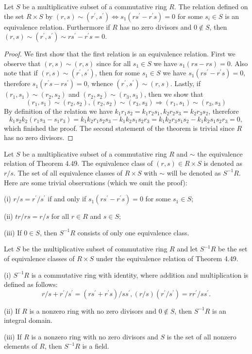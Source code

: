 \begin{theorem}
Let $S$ be a multiplicative subset of a commutative ring $R$. The relation defined on the set $R\times S$ by $(r,s)\sim(r^\prime,s^\prime)\Leftrightarrow s_1(rs^\prime-r^\prime s)=0$ for some $s_i\in S$ is an equivalence relation. Furthermore if $R$ has no zero divisors and $0\notin S$, then $(r,s)\sim(r^\prime,s^\prime)\sim rs^\prime-r^\prime s=0$.
\end{theorem}
\begin{proof}
We first show that the first relation is an equivalence relation. First we observe that $(r,s)\sim(r,s)$ since for all $s_1\in S$ we have $s_1(rs-rs)=0$. Also note that if $(r,s)\sim(r^\prime,s^\prime)$, then for some $s_1\in S$ we have $s_1(rs^\prime-r^\prime s)=0$, therefore $s_1(r^\prime s-rs^\prime)=0$, whence $(r^\prime,s^\prime)\sim(r,s)$. Lastly, if $(r_1,s_1)\sim(r_2,s_2)$ and $(r_2,s_2)\sim(r_3,s_3)$, then we show that 
$$
\left( r_1,s_1 \right) \sim \left( r_2,s_2 \right) ,\left( r_2,s_2 \right) \sim \left( r_3,s_3 \right) \Rightarrow \left( r_1,s_1 \right) \sim \left( r_3,s_3 \right) 
$$
By definition of the relation we have $k_1r_1s_2=k_1r_2s_1,k_2r_2s_3=k_2r_3s_2$, therefore 
$$
k_1s_2k_2\left( r_1s_3-s_1r_3 \right) =k_1k_2r_1s_2s_3-k_1k_2s_1s_2r_3=k_1k_2r_3s_1s_2-k_1k_2s_1s_2r_3=0,
$$
which finished the proof. The second statement of the theorem is trivial since $R$ has no zero divisors.
\end{proof}
Let $S$ be a multiplicative subset of a commutative ring $R$ and $\sim$ the equivalence relation of Theorem 4.49. The equivalence class of $(r,s)\in R\times S$ is denoted as $r/s$. The set of all equivalence classes of $R\times S$ with $\sim$ will be denoted as $S^{-1}R$. Here are some trivial observations (which we omit the proof):\par
(i) $r/s=r^\prime/s^\prime$ if and only if $s_1(rs^\prime-r^\prime s)=0$ for some $s_1\in S$;\par
(ii) $tr/rs=r/s$ for all $r\in R$ and $s\in S$;\par
(iii) If $0\in S$, then $S^{-1}R$ consists of only one equivalence class.
\begin{theorem}
Let $S$ be the multiplicative subset of commutative ring $R$ and let $S^{-1}R$ be the set of equivalence classes of $R\times S$ under the equivalence relation of Theorem 4.49.\par
(i) $S^{-1}R$ is a commutative ring with identity, where addition and multiplication is defined as follows:
$$
r/s+r^{\prime}/s^{\prime}=\left( rs^{\prime}+r^{\prime}s \right) /ss^{\prime},\left( r/s \right) \left( r^{\prime}/s^{\prime} \right) =rr^{\prime}/ss^{\prime}.
$$\par
(ii) If $R$ is a nonzero ring with no zero divisors and $0\notin S$, then $S^{-1}R$ is an integral domain.\par
(iii) If $R$ is a nonzero ring with no zero divisors and $S$ is the set of all nonzero elements of $R$, then $S^{-1}R$ is a field.
\end{theorem}
